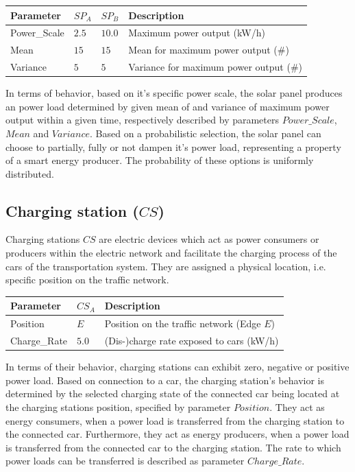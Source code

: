 \begin{table}[h]
	\renewcommand{\arraystretch}{1.3}
	\centering
	\begin{tabularx}{\columnwidth}{lllX}
		\hline
		\textbf{Parameter}                     & \textbf{$SP_{A}$} & \textbf{$SP_{B}$} & \textbf{Description} \\ \hline
		Power\_Scale                       	   & $2.5$ & $10.0$ & Maximum power output (kW/h) \\
		Mean                       	  		  & $15$ & $15$ & Mean for maximum power output (\#) \\
		Variance                       	       & $5$ & $5$ & Variance for maximum power output (\#) \\ \hline
	\end{tabularx}
\end{table}

In terms of behavior, based on it's specific power scale, the solar panel produces an power load determined by given mean of and variance of maximum power output within a given time, respectively described by parameters $Power\_Scale$, $Mean$ and $Variance$. Based on a probabilistic selection, the solar panel can choose to partially, fully or not dampen it's power load, representing a property of a smart energy producer. The probability of these options is uniformly distributed.

\subsection{Charging station ($CS$)}
\label{section:charging_station}

Charging stations $CS$ are electric devices which act as power consumers or producers within the electric network and facilitate the charging process of the cars of the transportation system. They are assigned a physical location, i.e. specific position on the traffic network. 

\begin{table}[h]
	\renewcommand{\arraystretch}{1.3}
	\centering
	\begin{tabularx}{\columnwidth}{llX}
		\hline
		\textbf{Parameter}      & \textbf{$CS_{A}$} & \textbf{Description} \\ \hline
		Position      			& $E$ & Position on the traffic network (Edge $E$) \\  
		Charge\_Rate        	& $5.0$ & (Dis-)charge rate exposed to cars (kW/h)     \\ \hline
	\end{tabularx}
\end{table}

In terms of their behavior, charging stations can exhibit zero, negative or positive power load. Based on connection to a car, the charging station's behavior is determined by the selected charging state of the connected car being located at the charging stations position, specified by parameter $Position$. They act as energy consumers, when a power load is transferred from the charging station to the connected car. Furthermore, they act as energy producers, when a power load is transferred from the connected car to the charging station. The rate to which power loads can be transferred is described as parameter $Charge\_Rate$.